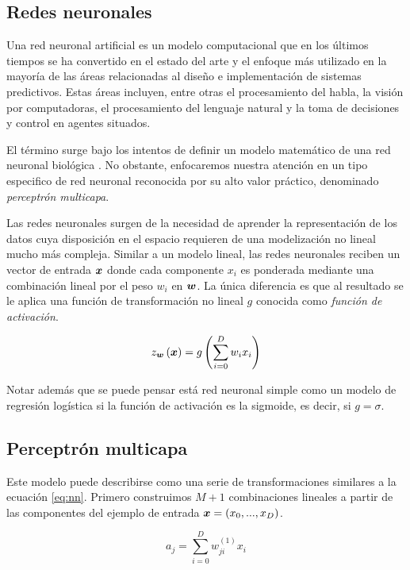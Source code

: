 \subsection{Redes neuronales}

Una red neuronal artificial es un modelo computacional que en los últimos
tiempos se ha convertido en el estado del arte y el enfoque más utilizado en la
mayoría de las áreas relacionadas al diseño e implementación de sistemas
predictivos. Estas áreas incluyen, entre otras el procesamiento del habla, la
visión por computadoras, el procesamiento del lenguaje natural y la toma de
decisiones y control en agentes situados.

El término surge bajo los intentos de definir un modelo matemático de una red
neuronal biológica \citep{McCulloch-Pitts-1990}. No obstante, enfocaremos
nuestra atención en un tipo especifico de red neuronal reconocida por su alto
valor práctico, denominado \emph{perceptrón multicapa}.

Las redes neuronales surgen de la necesidad de aprender la representación de los
datos cuya disposición en el espacio requieren de una modelización no lineal
mucho más compleja. Similar a un modelo lineal, las redes neuronales reciben un
vector de entrada $\boldsymbol{x}$ donde cada componente $x_i$ es ponderada mediante
una combinación lineal por el peso $w_i$ en $\boldsymbol{w}$. La única diferencia es
que al resultado se le aplica una función de transformación no lineal $g$
conocida como \emph{función de activación}.

\begin{equation} \label{eq:nn}
    z_{\boldsymbol{w}}\left( \boldsymbol{x} \right) = g\left( \sum_{i=0}^{D} w_i x_i \right)
\end{equation}

Notar además que se puede pensar está red neuronal simple como un modelo de
regresión logística si la función de activación es la sigmoide, es decir, si $g
= \sigma$.

\subsection{Perceptrón multicapa}
\label{subch:multi_layer_perceptron}

Este modelo puede describirse como una serie de transformaciones similares a la
ecuación \ref{eq:nn}. Primero construimos $M + 1$ combinaciones lineales a
partir de las componentes del ejemplo de entrada $\boldsymbol{x} = (x_0, ..., x_D)$.

\begin{equation}
    a_j = \sum_{i = 0}^{D} w_{ji}^{(1)} x_{i}
\end{equation}


